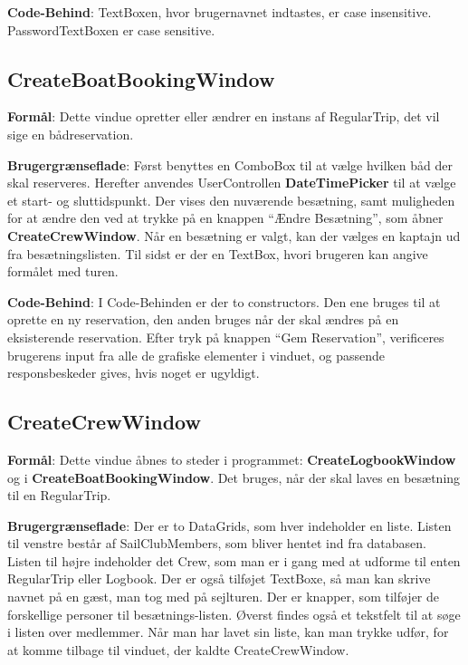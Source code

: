 \textbf{Code-Behind}: 
TextBoxen, hvor brugernavnet indtastes, er case insensitive.
PasswordTextBoxen er case sensitive. 

\subsection{CreateBoatBookingWindow}
\textbf{Formål}: 
Dette vindue opretter eller ændrer en instans af RegularTrip, det vil sige en bådreservation. 

\textbf{Brugergrænseflade}: 
Først benyttes en ComboBox til at vælge hvilken båd der skal reserveres.
Herefter anvendes UserControllen \textbf{DateTimePicker} til at vælge et start- og sluttidspunkt.
Der vises den nuværende besætning, samt muligheden for at ændre den ved at trykke på en knappen ``Ændre Besætning'', som åbner \textbf{CreateCrewWindow}.
Når en besætning er valgt, kan der vælges en kaptajn ud fra besætningslisten.
Til sidst er der en TextBox, hvori brugeren kan angive formålet med turen.

\textbf{Code-Behind}: 
I Code-Behinden er der to constructors. 
Den ene bruges til at oprette en ny reservation, den anden bruges når der skal ændres på en eksisterende reservation. 
Efter tryk på knappen ``Gem Reservation'', verificeres brugerens input fra alle de grafiske elementer i vinduet, og passende responsbeskeder gives, hvis noget er ugyldigt.

\subsection{CreateCrewWindow}

\textbf{Formål}: Dette vindue åbnes to steder i programmet: \textbf{CreateLogbookWindow} og i \textbf{CreateBoatBookingWindow}. 
Det bruges, når der skal laves en besætning til en RegularTrip.  

\textbf{Brugergrænseflade}: 
Der er to DataGrids, som hver indeholder en liste. 
Listen til venstre består af SailClubMembers, som bliver hentet ind fra databasen. 
Listen til højre indeholder det Crew, som man er i gang med at udforme til enten RegularTrip eller Logbook. 
Der er også tilføjet TextBoxe, så man kan skrive navnet på en gæst, man tog med på sejlturen. 
Der er knapper, som tilføjer de forskellige personer til besætnings-listen. 
Øverst findes også et tekstfelt til at søge i listen over medlemmer. 
Når man har lavet sin liste, kan man trykke udfør, for at komme tilbage til vinduet, der kaldte CreateCrewWindow.

